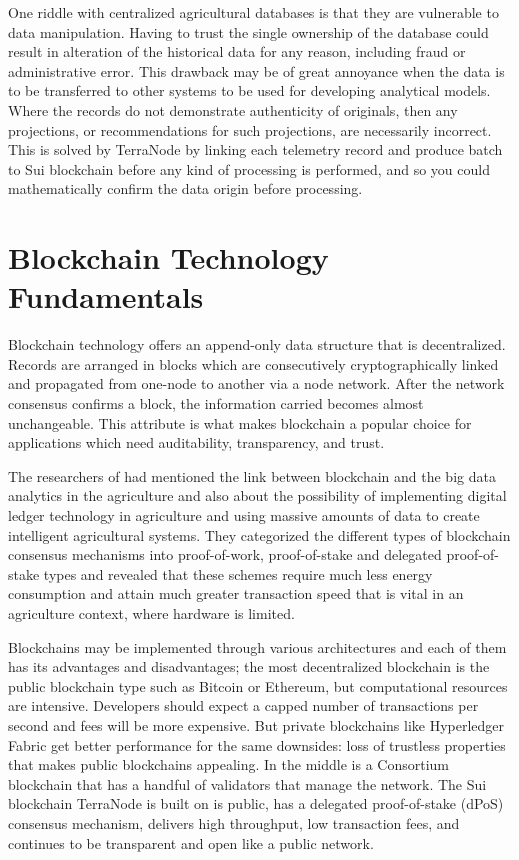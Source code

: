 One riddle with centralized agricultural databases is that they are vulnerable to data manipulation. Having to trust the single ownership of the database could result in alteration of the historical data for any reason, including fraud or administrative error. This drawback may be of great annoyance when the data is to be transferred to other systems to be used for developing analytical models. Where the records do not demonstrate authenticity of originals, then any projections, or recommendations for such projections, are necessarily incorrect. This is solved by TerraNode by linking each telemetry record and produce batch to Sui blockchain before any kind of processing is performed, and so you could mathematically confirm the data origin before processing.

\section{Blockchain Technology Fundamentals}

Blockchain technology offers an append-only data structure that is decentralized. Records are arranged in blocks which are consecutively cryptographically linked and propagated from one-node to another via a node network. After the network consensus confirms a block, the information carried becomes almost unchangeable. This attribute is what makes blockchain a popular choice for applications which need auditability, transparency, and trust.

The researchers of \textcite{chauhan2025blockchain} had mentioned the link between blockchain and the big data analytics in the agriculture and also about the possibility of implementing digital ledger technology in agriculture and using massive amounts of data to create intelligent agricultural systems. They categorized the different types of blockchain consensus mechanisms into proof-of-work, proof-of-stake and delegated proof-of-stake types and revealed that these schemes require much less energy consumption and attain much greater transaction speed that is vital in an agriculture context, where hardware is limited.

Blockchains may be implemented through various architectures and each of them has its advantages and disadvantages; the most decentralized blockchain is the public blockchain type such as Bitcoin or Ethereum, but computational resources are intensive. Developers should expect a capped number of transactions per second and fees will be more expensive. But private blockchains like Hyperledger Fabric get better performance for the same downsides: loss of trustless properties that makes public blockchains appealing. In the middle is a Consortium blockchain that has a handful of validators that manage the network. The Sui blockchain TerraNode is built on is public, has a delegated proof-of-stake (dPoS) consensus mechanism, delivers high throughput, low transaction fees, and continues to be transparent and open like a public network.


